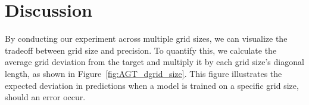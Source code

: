 \documentclass[conference]{IEEEtran}
\begin{document}

	
	
	\section{Discussion}
	By conducting our experiment across multiple grid sizes, we can visualize the tradeoff between grid size and precision. To quantify this, we calculate the average grid deviation from the target and multiply it by each grid size’s diagonal length, as shown in Figure~\ref{fig:AGT_dgrid_size}. This figure illustrates the expected deviation in predictions when a model is trained on a specific grid size, should an error occur.
	
\end{document}
